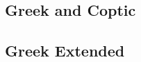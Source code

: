\documentclass{article}
\begin{document}
\subsection{Greek and Coptic}

\subsubsection{\GreekAndCopticI}
\subsubsection{\GreekAndCopticII}
\subsubsection{\GreekAndCopticIII}
\subsubsection{\GreekAndCopticIV}


\subsection{Greek Extended}

\subsubsection{\GreekExtendedI}
\subsubsection{\GreekExtendedII}
\subsubsection{\GreekExtendedIII}
\subsubsection{\GreekExtendedIV}
\subsubsection{\GreekExtendedV}
\subsubsection{\GreekExtendedVI}
\subsubsection{\GreekExtendedVII}
\end{document}
